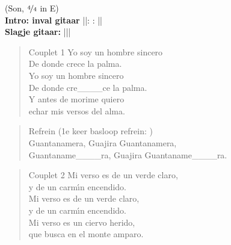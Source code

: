 (Son, $\nicefrac{4}{4}$ in E)\\
\textbf{Intro: inval gitaar}
||:  : ||\\
\textbf{Slagje gitaar:}
|\hspace{1em}\hspace{1em}|\hspace{2em}|\\

\begin{verse}{Couplet 1}
  \hspace{1em} Yo soy un hombre sincero
  \\
  \hspace{1em} De donde crece la palma.
  \\
  \hspace{1em} Yo soy un hombre sincero
  \\
  De donde cre\_\_\_\_ce la palma.
  \\
  Y antes de morime quiero
  \\
  echar mis versos del alma.
\end{verse}

\begin{verse}{Refrein}
  (1e keer basloop refrein: )\\
  Guantanamera, \hspace{1em} Guajira Guantanamera,\hspace{1em} 
  \\
  Guantaname\_\_\_\_ra, Guajira Guantaname\_\_\_\_ra.
\end{verse}

\begin{verse}{Couplet 2}
  \hspace{1em} Mi verso es de un verde claro,
  \\
  \hspace{1em} y de un carm\'{\i}n encendido.
  \\
  \hspace{1em} Mi verso es de un verde claro,
  \\
  y de un carm\'{\i}n encendido.
  \\
  Mi verso es un ciervo herido, \hspace{1em}
  \\
  que busca en el monte amparo. \hspace{1em}
\end{verse}


